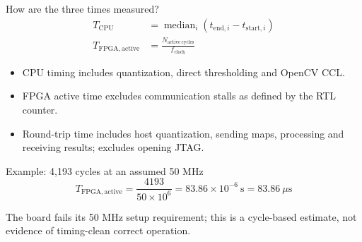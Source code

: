 \documentclass[aspectratio=169,10pt]{beamer}
\begin{document}
\begin{frame}{How are the three times measured?}
\begin{align*}
T_{\mathrm{CPU}} &= \operatorname{median}_{i}(t_{\mathrm{end},i}-t_{\mathrm{start},i}) \\
T_{\mathrm{FPGA,active}} &= \frac{N_{\mathrm{active\ cycles}}}{f_{\mathrm{clock}}}
\end{align*}
\begin{itemize}
\item CPU timing includes quantization, direct thresholding and OpenCV CCL.
\item FPGA active time excludes communication stalls as defined by the RTL counter.
\item Round-trip time includes host quantization, sending maps, processing and receiving results; excludes opening JTAG.
\end{itemize}
\begin{exampleblock}{Example: 4,193 cycles at an assumed 50 MHz}
\[
T_{\mathrm{FPGA,active}}=\frac{4193}{50\times10^6}
=83.86\times10^{-6}\ \mathrm{s}=83.86\ \mu\mathrm{s}
\]
\end{exampleblock}
\scriptsize The board fails its 50 MHz setup requirement; this is a cycle-based estimate, not evidence of timing-clean correct operation.
\end{frame}
\end{document}
